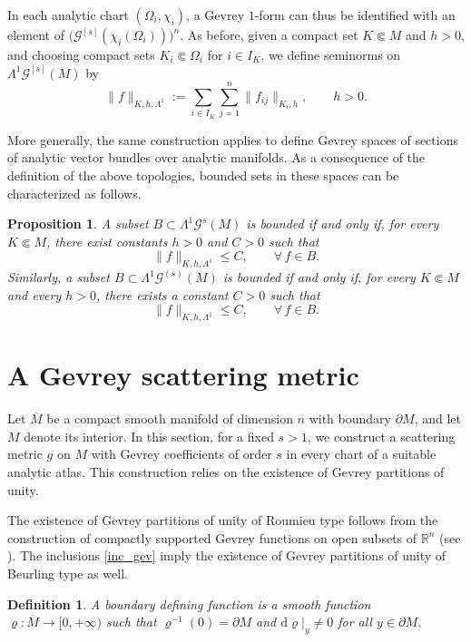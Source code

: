 \documentclass[11pt,reqno]{amsart}
\numberwithin{equation}{section}
\newtheorem{definition}[theorem]{Definition}
\newtheorem{proposition}[theorem]{Proposition}
\begin{document}
	In each analytic chart $(\Omega_i,\chi_i)$, a Gevrey $1$-form can thus be identified with an element of $\big(\mathscr{G}^{[s]}(\chi_i(\Omega_i))\big)^n$. As before, given a compact set $K\Subset M$ and $h>0$, and choosing compact sets $K_i\Subset\Omega_i$ for $i\in I_K$, we define seminorms on $\mathsf{\Lambda}^1\mathscr{G}^{[s]}(M)$ by
	\[
	\|f\|_{K,h,\mathsf{\Lambda}^1}
	:= \sum_{i\in I_K}\sum_{j=1}^n \|f_{ij}\|_{K_i,h},
	\qquad h>0.
	\]
	
	More generally, the same construction applies to define Gevrey spaces of sections of analytic vector bundles over analytic manifolds. As a consequence of the definition of the above topologies, bounded sets in these spaces can be characterized as follows.
	
	\begin{proposition}
		A subset $B\subset \mathsf{\Lambda}^1\mathscr{G}^s(M)$ is bounded if and only if, for every $K\Subset M$, there exist constants $h>0$ and $C>0$ such that
		\[
		\|f\|_{K,h,\mathsf{\Lambda}^1} \leq C,
		\qquad \forall\, f\in B.
		\]
		Similarly, a subset $B\subset \mathsf{\Lambda}^1\mathscr{G}^{(s)}(M)$ is bounded if and only if, for every $K\Subset M$ and every $h>0$, there exists a constant $C>0$ such that
		\[
		\|f\|_{K,h,\mathsf{\Lambda}^1} \leq C,
		\qquad \forall\, f\in B.
		\]
	\end{proposition}
	


	\section{A Gevrey scattering metric}\label{gev_sc_met}
	
	Let $\overline{M}$ be a compact smooth manifold of dimension $n$ with boundary $\partial M$, and let $M$ denote its interior. In this section, for a fixed $s>1$, we construct a scattering metric $g$ on $M$ with Gevrey coefficients of order $s$ in every chart of a suitable analytic atlas. This construction relies on the existence of Gevrey partitions of unity.
	
	The existence of Gevrey partitions of unity of Roumieu type follows from the construction of compactly supported Gevrey functions on open subsets of $\mathbb{R}^n$ (see \cite[Example~1.4.9]{Rod_Gevrey}). The inclusions \eqref{inc_gev} imply the existence of Gevrey partitions of unity of Beurling type as well.
	
	\begin{definition}
		A \emph{boundary defining function} is a smooth function $\varrho:\overline{M}\to[0,+\infty)$ such that
		$\varrho^{-1}(0)=\partial M$ and $\mathrm{d}\varrho|_y \neq 0$ for all $y\in\partial M$.
	\end{definition}
	
\end{document}
